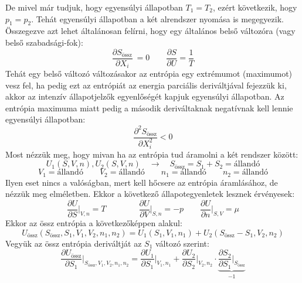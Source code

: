 \documentclass[a4paper,12pt]{article}
\begin{document}
De mivel már tudjuk, hogy egyensúlyi állapotban $T_1 = T_2$, ezért következik, hogy $p_1 = p_2$. Tehát egyensúlyi állapotban a két alrendszer nyomása is megegyezik.
\newline
\newline
Összegezve azt lehet általánosan felírni, hogy egy általános belső változóra (vagy belső szabadsági-fok):
\begin{equation}
    \frac{\partial S_{\text{össz}}}{\partial X_i}\ = 0 \quad \quad \frac{\partial S}{\partial U} = \frac{1}{T}
\end{equation}
Tehát egy belső változó változásakor az entrópia egy extrémumot (maximumot) vesz fel, ha pedig ezt az entrópiát az energia parciális deriváltjával fejezzük ki, akkor az intenzív állapotjelzők egyenlőségét kapjuk egyensúlyi állapotban.
Az entrópia maximuma miatt pedig a második deriváltaknak negatívnak kell lennie egyensúlyi állapotban:
\begin{equation}
    \frac{\partial^2 S_{\text{össz}}}{\partial X_i^2} < 0
\end{equation}
\newline
\newline
Most nézzük meg, hogy mivan ha az entrópia tud áramolni a két rendszer között:
\begin{equation}
    U_1(S, V, n), U_2(S, V, n) \quad \to \quad S_{\text{össz}} = S_1 + S_2 = \text{állandó}
\end{equation}
\begin{equation}
    V_1 = \text{állandó} \qquad V_2 = \text{állandó} \qquad n_1 = \text{állandó} \qquad n_2 = \text{állandó}
\end{equation}
Ilyen eset nincs a valóságban, mert kell hőcsere az entrópia áramlásához, de nézzük meg elméletben. Ekkor a következő állapotegyenletek lesznek érvényesek:
\begin{equation}
    \frac{\partial U}{\partial S}\bigg|_{V,n} = T \qquad \qquad \frac{\partial U}{\partial V}\bigg|_{S,n} = - p \qquad \frac{\partial U}{\partial n}\bigg|_{S,V} = \mu
\end{equation}
Ekkor az össz entrópia a következőképpen alakul:
\begin{equation}
    U_{\text{össz}} (S_{\text{össz}}, S_1, V_1, V_2, n_1, n_2) = U_1(S_1, V_1, n_1) + U_2(S_{\text{össz}} - S_1, V_2, n_2)
\end{equation}
Vegyük az össz entrópia deriváltját az $S_1$ változó szerint:
\begin{equation}
    \frac{\partial U_{\text{össz}}}{\partial S_1}\bigg|_{S_{\text{össz}}, V_1, V_2, n_1, n_2} = \frac{\partial U_1}{\partial S_1}\bigg|_{V_1, n_1} + \frac{\partial U_2}{\partial S_2}\bigg|_{V_2, n_2} \cdot \underbrace{\frac{\partial S_2}{\partial S_1}\bigg|_{S_{\text{össz}}}}_{-1}
\end{equation}
\end{document}
